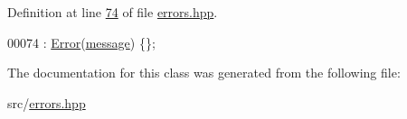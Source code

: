 Definition at line \hyperlink{errors_8hpp_source_l00074}{74} of file \hyperlink{errors_8hpp_source}{errors.\+hpp}.


\begin{DoxyCode}
00074 : \hyperlink{classError_accd611f3ddae0828adeb6ca251113ffd}{Error}(\hyperlink{classError_aa4713ef3ee9c3c0da43a54b01949510d}{message}) \{\};
\end{DoxyCode}


The documentation for this class was generated from the following file\+:\begin{DoxyCompactItemize}
\item 
src/\hyperlink{errors_8hpp}{errors.\+hpp}\end{DoxyCompactItemize}
